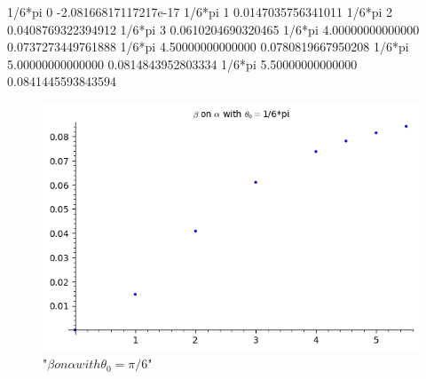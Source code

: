 \documentclass[11pt]{article}
\begin{document}

1/6*pi 0 -2.08166817117217e-17
1/6*pi 1 0.0147035756341011
1/6*pi 2 0.0408769322394912
1/6*pi 3 0.0610204690320465
1/6*pi 4.00000000000000 0.0737273449761888
1/6*pi 4.50000000000000 0.0780819667950208
1/6*pi 5.00000000000000 0.0814843952803334
1/6*pi 5.50000000000000 0.0841445593843594

    
\begin{figure}
\centering
\includegraphics{output_38_1.png}
\caption{"$\beta on \alpha with \theta_0 =  \pi/6$" }
\end{figure}
\end{document}
